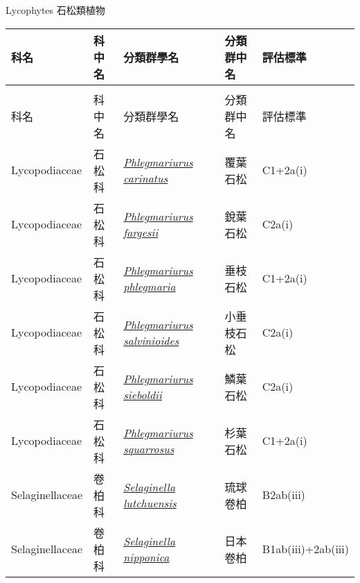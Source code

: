 \noindent\normalfont\selectfont Lycophytes 石松類植物
\footnotesize\selectfont
        {\def\arraystretch{1.5}\tabcolsep=2pt
        \begin{longtable}{p{2.5cm}p{2.5cm}p{4.5cm}p{2.5cm}p{3cm}}
        \toprule
          科名 & 科中名 & 分類群學名 & 分類群中名 & 評估標準 \\
        \midrule 
        \endfirsthead

        \multicolumn{4}{l}{\bfseries\Large\color{red}{國家瀕危 (NEN) 類別維管束植物名錄(續)}} \\
        \toprule
        科名 & 科中名 & 分類群學名 & 分類群中名 & 評估標準 \\
        \midrule
        \endhead
                Lycopodiaceae & 石松科 & \href{http://www.theplantlist.org/tpl1.1/search?q=Phlegmariurus+carinatus}{\textit{Phlegmariurus carinatus} } & 覆葉石松 & C1+2a(i) \index{Phlegmariurus@\textit{Phlegmariurus}!carinatus@\textit{carinatus}}  \index{覆葉石松} \\
    Lycopodiaceae & 石松科 & \href{http://www.theplantlist.org/tpl1.1/search?q=Phlegmariurus+fargesii}{\textit{Phlegmariurus fargesii} } & 銳葉石松 & C2a(i) \index{Phlegmariurus@\textit{Phlegmariurus}!fargesii@\textit{fargesii}}  \index{銳葉石松} \\
    Lycopodiaceae & 石松科 & \href{http://www.theplantlist.org/tpl1.1/search?q=Phlegmariurus+phlegmaria}{\textit{Phlegmariurus phlegmaria} } & 垂枝石松 & C1+2a(i) \index{Phlegmariurus@\textit{Phlegmariurus}!phlegmaria@\textit{phlegmaria}}  \index{垂枝石松} \\
    Lycopodiaceae & 石松科 & \href{http://www.theplantlist.org/tpl1.1/search?q=Phlegmariurus+salvinioides}{\textit{Phlegmariurus salvinioides} } & 小垂枝石松 & C2a(i) \index{Phlegmariurus@\textit{Phlegmariurus}!salvinioides@\textit{salvinioides}}  \index{小垂枝石松} \\
    Lycopodiaceae & 石松科 & \href{http://www.theplantlist.org/tpl1.1/search?q=Phlegmariurus+sieboldii}{\textit{Phlegmariurus sieboldii} } & 鱗葉石松 & C2a(i) \index{Phlegmariurus@\textit{Phlegmariurus}!sieboldii@\textit{sieboldii}}  \index{鱗葉石松} \\
    Lycopodiaceae & 石松科 & \href{http://www.theplantlist.org/tpl1.1/search?q=Phlegmariurus+squarrosus}{\textit{Phlegmariurus squarrosus} } & 杉葉石松 & C1+2a(i) \index{Phlegmariurus@\textit{Phlegmariurus}!squarrosus@\textit{squarrosus}}  \index{杉葉石松} \\
    Selaginellaceae & 卷柏科 & \href{http://www.theplantlist.org/tpl1.1/search?q=Selaginella+lutchuensis}{\textit{Selaginella lutchuensis} } & 琉球卷柏 & B2ab(iii) \index{Selaginella@\textit{Selaginella}!lutchuensis@\textit{lutchuensis}}  \index{琉球卷柏} \\
    Selaginellaceae & 卷柏科 & \href{http://www.theplantlist.org/tpl1.1/search?q=Selaginella+nipponica}{\textit{Selaginella nipponica} } & 日本卷柏 & B1ab(iii)+2ab(iii) \index{Selaginella@\textit{Selaginella}!nipponica@\textit{nipponica}}  \index{日本卷柏} \\
    \bottomrule
        \end{longtable}
        }
    